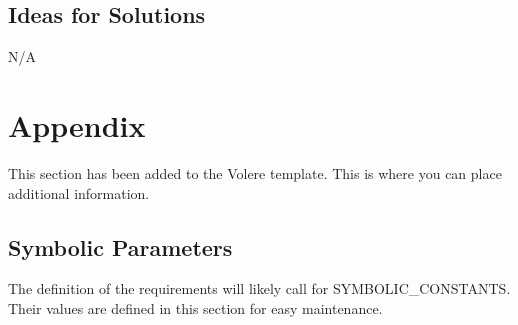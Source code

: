 \documentclass[12pt, titlepage]{article}
\begin{document}
\subsection{Ideas for Solutions}
N/A





\newpage

\section{Appendix}

This section has been added to the Volere template.  This is where you can place
additional information.

\subsection{Symbolic Parameters}

The definition of the requirements will likely call for SYMBOLIC\_CONSTANTS.
Their values are defined in this section for easy maintenance.
\end{document}
